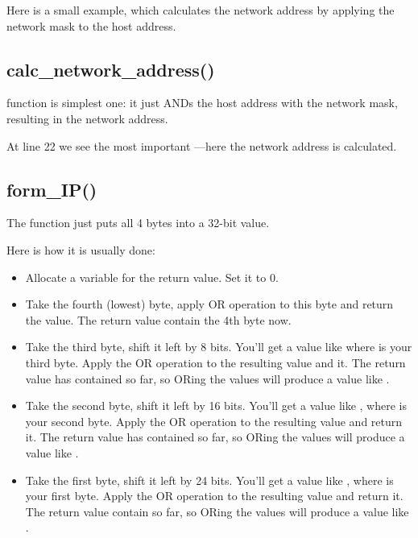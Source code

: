 Here is a small example, which calculates the network address by applying the network mask to the host address.



\subsection{calc\_network\_address()}

 function is simplest one: 
it just ANDs the host address with the network mask, resulting in the network address.



At line 22 we see the most important \AND---here the network address is calculated.

\subsection{form\_IP()}

The  function just puts all 4 bytes into a 32-bit value.

Here is how it is usually done:

\begin{itemize}
\item Allocate a variable for the return value.  Set it to 0.

\item Take the fourth (lowest) byte, apply OR operation to this byte and return the value.
The return value contain the 4th byte now.

\item Take the third byte, shift it left by 8 bits.
You'll get a value like  where  is your third byte.
Apply the OR operation to the resulting value and it.
The return value has contained  so far, so ORing the values will produce a value 
like .

\item Take the second byte, shift it left by 16 bits.
You'll get a value like , where  is your second byte.
Apply the OR operation to the resulting value and return it.
The return value has contained  so far, so ORing the values will produce
a value like .

\item Take the first byte, shift it left by 24 bits.
You'll get a value like , where  is your first byte.
Apply the OR operation to the resulting value and return it.
The return value contain  so far, so ORing the values will produce
a value like .

\end{itemize}

